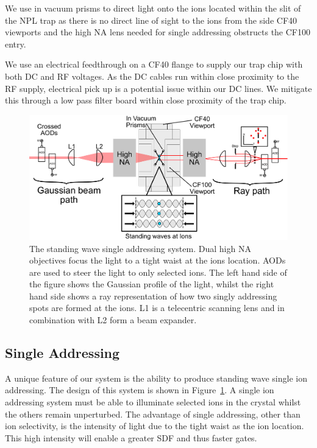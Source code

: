 \documentclass[12pt]{iopart}
\begin{document}
We use in vacuum prisms to direct light onto the ions located within
the slit of the NPL trap as there is no direct line of sight to the ions from
the side CF40 viewports and the high NA lens needed for single
addressing obstructs the CF100 entry.

We use an electrical feedthrough on a CF40 flange to supply our trap
chip with both DC and RF voltages. As the DC cables run within close
proximity to the RF supply, electrical pick up is a potential issue
within our DC lines. We mitigate this through a low pass filter board
within close proximity of the trap chip.


\begin{figure}[b]
  \begin{center}
   \noindent\includegraphics[width=\linewidth]{figures/vac_can_AOD_small.pdf}
  \end{center}
  \caption{The standing wave single addressing system. Dual high NA
    objectives focus the light to a tight waist at the ions
    location. AODs are used to steer the light to only selected
    ions. The left hand side of the figure shows the Gaussian profile
    of the light, whilst the right hand side shows a ray
    representation of how two singly addressing spots are formed at
    the ions. L1 is a telecentric scanning lens and in combination
    with L2 form a beam expander.}
  \label{fig:AOD}
\end{figure}

\subsection{Single Addressing}

A unique feature of our system is the ability to produce standing wave
single ion addressing. The design of this system is shown in
Figure~\ref{fig:AOD}.  A single ion addressing system must be able to
illuminate selected ions in the crystal whilst the others remain
unperturbed. The advantage of single addressing, other than ion
selectivity, is the intensity of light due to the tight waist as the
ion location. This high intensity will enable a greater SDF and thus
faster gates.
\end{document}
